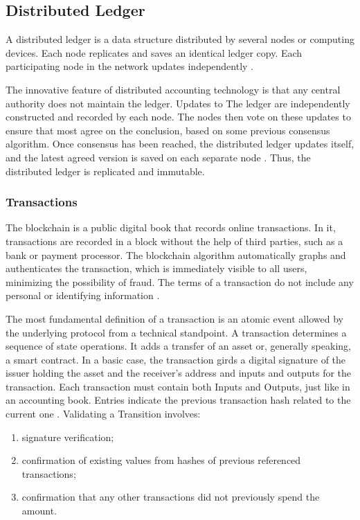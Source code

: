 \subsection{Distributed Ledger}\label{sec:livro}
A distributed ledger is a data structure distributed by several nodes or computing devices. Each node replicates and saves an identical ledger copy. Each participating node in the network updates independently \cite{greve2018blockchain}.

The innovative feature of distributed accounting technology is that any central authority does not maintain the ledger. Updates to The ledger are independently constructed and recorded by each node. The nodes then vote on these updates to ensure that most agree on the conclusion, based on some previous consensus algorithm. Once consensus has been reached, the distributed ledger updates itself, and the latest agreed version is saved on each separate node \cite{swan2015blockchain}. Thus, the distributed ledger is replicated and immutable. 

\subsubsection{Transactions}\label{sec:transac}
The blockchain is a public digital book that records online transactions. In it, transactions are recorded in a block without the help of third parties, such as a bank or payment processor. The blockchain algorithm automatically graphs and authenticates the transaction, which is immediately visible to all users, minimizing the possibility of fraud. The terms of a transaction do not include any personal or identifying information \cite{Bankrate2018}.

The most fundamental definition of a transaction is an atomic event allowed by the underlying protocol from a technical standpoint. A transaction determines a sequence of state operations.  It adds a transfer of an asset or, generally speaking, a smart contract.  In a basic case, the transaction girds a digital signature of the issuer holding the asset and the receiver's address and inputs and outputs for the transaction. Each transaction must contain both Inputs and Outputs, just like in an accounting book. Entries indicate the previous transaction hash related to the current one \cite{greve2018blockchain}. Validating a Transition involves:

\begin{enumerate}
	\item signature verification;
	\item confirmation of existing values from hashes of previous referenced transactions;
	\item confirmation that any other transactions did not previously spend the amount.
\end{enumerate}


